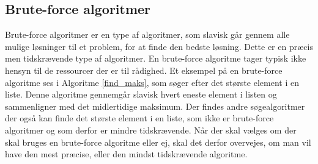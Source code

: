 \subsection{Brute-force algoritmer}
Brute-force algoritmer er en type af algoritmer, som slavisk går gennem alle mulige løsninger til et problem, for at finde den bedste løsning.
Dette er en præcis men tidskrævende type af algoritmer. 
En brute-force algoritme tager typisk ikke hensyn til de ressourcer der er til rådighed.
Et eksempel på en brute-force algoritme ses i Algoritme \ref{find_maks}, som søger efter det største element i en liste. 
Denne algoritme gennemgår slavisk hvert eneste element i listen og sammenligner med det midlertidige maksimum.
Der findes andre søgealgoritmer der også kan finde det største element i en liste, som ikke er brute-force algoritmer og som derfor er mindre tidskrævende. 
Når der skal vælges om der skal bruges en brute-force algoritme eller ej, skal det derfor overvejes, om man vil have den mest præcise, eller den mindst tidskrævende algoritme. 
